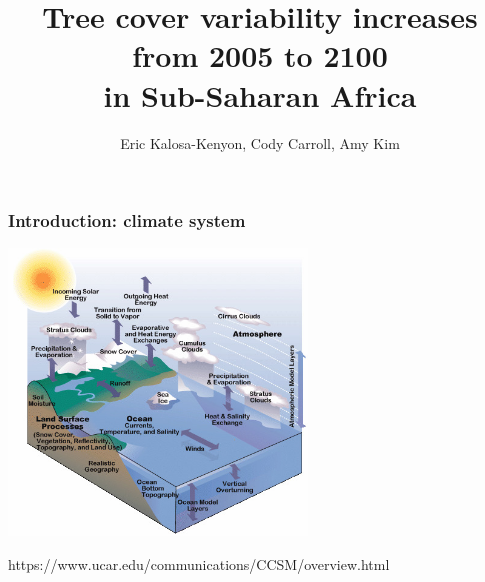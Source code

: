 \documentclass{beamer}
\title{Tree cover variability increases from 2005 to 2100\\ in Sub-Saharan Africa}
\author{Eric Kalosa-Kenyon, Cody Carroll, Amy Kim}
\institute{University of California, Davis}
\date{}
\begin{document}
\frame{\titlepage}

\begin{frame}
    \frametitle{Introduction: climate system}
    \includegraphics[height=3in]{../img/ccsm_diagram_picture.jpeg}

    https://www.ucar.edu/communications/CCSM/overview.html
\end{frame}
\end{document}
